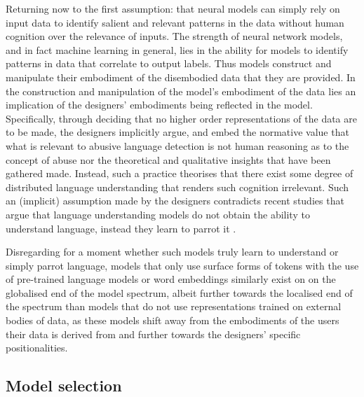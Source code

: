 Returning now to the first assumption: that neural models can simply rely on input data to identify salient and relevant patterns in the data without human cognition over the relevance of inputs. The strength of neural network models, and in fact machine learning in general, lies in the ability for models to identify patterns in data that correlate to output labels. Thus models construct and manipulate their embodiment of the disembodied data that they are provided. In the construction and manipulation of the model's embodiment of the data lies an implication of the designers' embodiments being reflected in the model. Specifically, through deciding that no higher order representations of the data are to be made, the designers implicitly argue, and embed the normative value that what is relevant to abusive language detection is not human reasoning as to the concept of abuse nor the theoretical and qualitative insights that have been gathered made. Instead, such a practice theorises that there exist some degree of distributed language understanding that renders such cognition irrelevant. Such an (implicit) assumption made by the designers contradicts recent studies that argue that language understanding models do not obtain the ability to understand language, instead they learn to parrot it \citep{Bender-Koller:2020}.

Disregarding for a moment whether such models truly learn to understand or simply parrot language, models that only use surface forms of tokens with the use of pre-trained language models or word embeddings similarly exist on on the globalised end of the model spectrum, albeit further towards the localised end of the spectrum than models that do not use representations trained on external bodies of data, as these models shift away from the embodiments of the users their data is derived from and further towards the designers' specific positionalities.

\subsection{Model selection}

